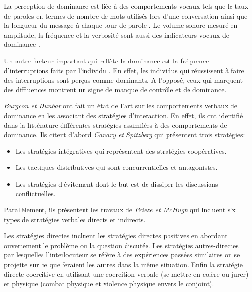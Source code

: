 			La perception de dominance est liée à des comportements vocaux tels que le taux de paroles en termes de nombre de mots utilisés lors d'une conversation ainsi que la longueur du message à chaque tour de parole \cite{dunbar2005perceptions}. Le volume sonore mesuré en amplitude, la fréquence et la verbosité sont aussi des indicateurs vocaux de dominance \cite{dunbar2005perceptions}. 
			
			Un autre facteur important qui reflète la dominance est la fréquence d'interruptions faite par l'individu \cite{dunbar2005perceptions,hall2005nonverbal}. En effet, les individus qui réussissent à faire des interruptions sont perçus comme dominants. A l'opposé, ceux qui marquent des diffluences montrent un signe de manque de contrôle et de dominance. 
			
			\emph{Burgoon et Dunbar} \cite{dunbar2005perceptions} ont fait un état de l'art sur les comportements verbaux de dominance en les associant des stratégies d'interaction. En effet, ils ont identifié dans la littérature différentes stratégies assimilées à des comportements de dominance. Ils citent d'abord \emph{Canary et Spitzberg} \cite{canary1987} qui présentent trois stratégies:    
			 \begin{itemize}     
			 	
			 	\item Les stratégies intégratives qui représentent des stratégies coopératives.
				
				\item Les tactiques distributives qui sont concurrentielles et antagonistes.
				
				\item Les stratégies d'évitement dont le but est de dissiper les discussions conflictuelles. 
				
			\end{itemize}
			
			Parallèlement, ils présentent les travaux de \emph{Frieze et McHugh} \cite{frieze1992power} qui incluent six types de stratégies verbales directs et indirects. 
			
			Les stratégies directes incluent les stratégies
			directes positives en abordant ouvertement le problème ou la question discutée. Les stratégies autres-directes par lesquelles l'interlocuteur se réfère à des expériences passées similaires ou se projette sur ce que feraient les autres dans la même situation. Enfin la stratégie directe coercitive en utilisant une coercition verbale (se mettre en colère ou jurer) et physique (combat physique et violence physique envers le conjoint). 
			
